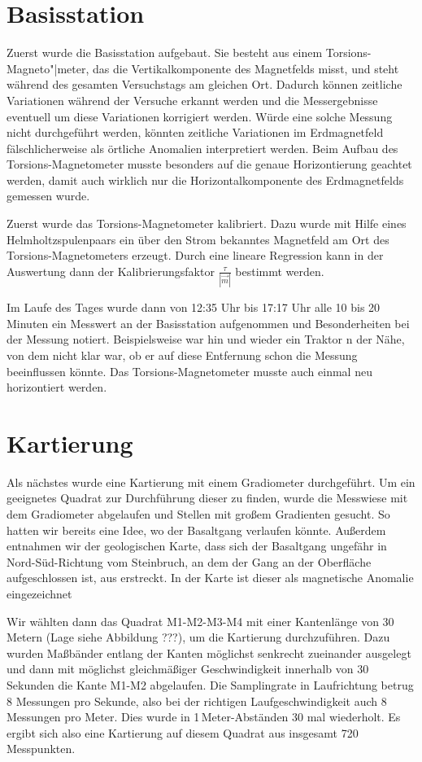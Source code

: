 \section{Basisstation}

Zuerst wurde die Basisstation aufgebaut. Sie besteht aus einem Torsions-Magneto"|meter, das die Vertikalkomponente des Magnetfelds misst, und steht während des gesamten Versuchstags am gleichen Ort. Dadurch können zeitliche Variationen während der Versuche erkannt werden und die Messergebnisse eventuell um diese Variationen korrigiert werden. Würde eine solche Messung nicht durchgeführt werden, könnten zeitliche Variationen im Erdmagnetfeld fälschlicherweise als örtliche Anomalien interpretiert werden. Beim Aufbau des Torsions-Magnetometer musste besonders auf die genaue Horizontierung geachtet werden, damit auch wirklich nur die Horizontalkomponente des Erdmagnetfelds gemessen wurde.

Zuerst wurde das Torsions-Magnetometer kalibriert. Dazu wurde mit Hilfe eines Helmholtzspulenpaars ein über den Strom bekanntes Magnetfeld am Ort des Torsions-Magnetometers erzeugt. Durch eine lineare Regression kann in der Auswertung dann der Kalibrierungsfaktor $\frac{\tau}{|\vec{m}|}$ bestimmt werden.

Im Laufe des Tages wurde dann von 12:35 Uhr bis 17:17 Uhr alle 10 bis 20 Minuten ein Messwert an der Basisstation aufgenommen und Besonderheiten bei der Messung notiert. Beispielsweise war hin und wieder ein Traktor n der Nähe, von dem nicht klar war, ob er auf diese Entfernung schon  die Messung beeinflussen könnte. Das Torsions-Magnetometer musste auch einmal neu horizontiert werden.

\section{Kartierung}

Als nächstes wurde eine Kartierung mit einem Gradiometer durchgeführt. Um ein geeignetes Quadrat zur Durchführung dieser zu finden, wurde die Messwiese mit dem Gradiometer abgelaufen und Stellen mit großem Gradienten gesucht. So hatten wir bereits eine Idee, wo der Basaltgang verlaufen könnte. Außerdem entnahmen wir der geologischen Karte, dass sich der Basaltgang ungefähr in Nord-Süd-Richtung vom Steinbruch, an dem der Gang an der Oberfläche aufgeschlossen ist, aus erstreckt. In der Karte ist dieser als magnetische Anomalie eingezeichnet

Wir wählten dann das Quadrat M1-M2-M3-M4 mit einer Kantenlänge von 30 Metern (Lage siehe Abbildung ???), um die Kartierung durchzuführen. Dazu wurden Maßbänder entlang der Kanten möglichst senkrecht zueinander ausgelegt und dann mit möglichst gleichmäßiger Geschwindigkeit innerhalb von 30 Sekunden die Kante M1-M2 abgelaufen. Die Samplingrate in Laufrichtung betrug 8 Messungen pro Sekunde, also bei der richtigen Laufgeschwindigkeit auch 8 Messungen pro Meter. Dies wurde in 1\,Meter-Abständen 30 mal wiederholt. Es ergibt sich also eine Kartierung auf diesem Quadrat aus insgesamt 720 Messpunkten.

